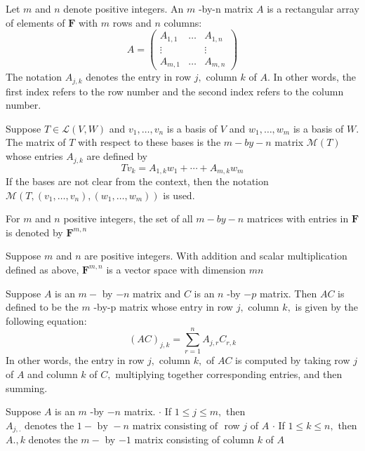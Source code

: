 
Let $m$ and $n$ denote positive integers. An $m$ -by-n matrix $A$ is a rectangular array of elements of $\mathbf{F}$ with $m$ rows and $n$ columns:
$$
A=\left(\begin{array}{ccc}
{A_{1,1}} & {\dots} & {A_{1, n}} \\
{\vdots} & {} & {\vdots} \\
{A_{m, 1}} & {\dots} & {A_{m, n}}
\end{array}\right)
$$
The notation $A_{j, k}$ denotes the entry in row $j,$ column $k$ of $A .$ In other words, the first index refers to the row number and the second index refers to the column number.

Suppose $T \in \mathcal{L}(V, W)$ and $v_{1}, \ldots, v_{n}$ is a basis of $V$ and $w_{1}, \ldots, w_{m}$ is a basis of $W .$ The matrix of $T$ with respect to these bases is the $m-b y-n$ matrix $\mathcal{M}(T)$ whose entries $A_{j, k}$ are defined by
$$
T v_{k}=A_{1, k} w_{1}+\cdots+A_{m, k} w_{m}
$$
If the bases are not clear from the context, then the notation $\mathcal{M}\left(T,\left(v_{1}, \ldots, v_{n}\right),\left(w_{1}, \ldots, w_{m}\right)\right)$ is used.

For $m$ and $n$ positive integers, the set of all $m-b y-n$ matrices with entries in $\mathbf{F}$ is denoted by $\mathbf{F}^{m, n}$

Suppose $m$ and $n$ are positive integers. With addition and scalar multiplication defined as above, $\mathbf{F}^{m, n}$ is a vector space with dimension $m n$

Suppose $A$ is an $m-$ by $-n$ matrix and $C$ is an $n$ -by $-p$ matrix. Then $A C$ is defined to be the $m$ -by-p matrix whose entry in row $j,$ column $k,$ is given by the following equation:
$$
(A C)_{j, k}=\sum_{r=1}^{n} A_{j, r} C_{r, k}
$$
In other words, the entry in row $j,$ column $k,$ of $A C$ is computed by taking row $j$ of $A$ and column $k$ of $C,$ multiplying together corresponding entries, and then summing.

Suppose $A$ is an $m$ -by $-n$ matrix.
$\cdot$ If $1 \leq j \leq m,$ then $A_{j,.} \text { denotes the } 1-\text { by }-n \text { matrix consisting of }$ row $j$ of $A$
$\cdot$ If $1 \leq k \leq n,$ then $A., k$ denotes the $m-$ by $-1$ matrix consisting of column $k$ of $A$

